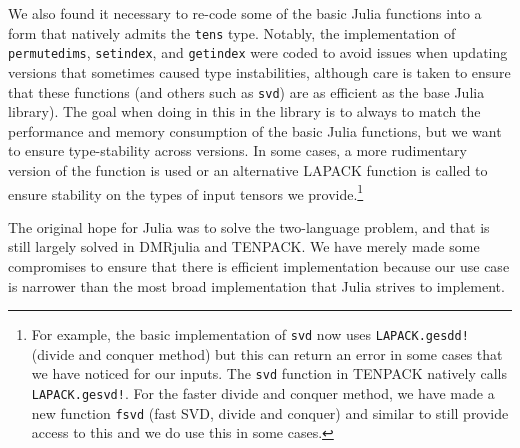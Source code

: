 \documentclass{juliacon}
\begin{document}
We also found it necessary to re-code some of the basic Julia functions into a form that natively admits the {\tt tens} type. Notably, the implementation of {\tt permutedims}, {\tt setindex}, and {\tt getindex} were coded to avoid issues when updating versions that sometimes caused type instabilities, although care is taken to ensure that these functions (and others such as {\tt svd}) are as efficient as the base Julia library). %
The goal when doing in this in the library is to always to match the performance and memory consumption of the basic Julia functions, but we want to ensure type-stability across versions. In some cases, a more rudimentary version of the function is used \cite{press1992numerical} or an alternative LAPACK function is called to ensure stability on the types of input tensors we provide.\footnote{For example, the basic implementation of {\tt svd} now uses {\tt LAPACK.gesdd!} (divide and conquer method) but this can return an error in some cases that we have noticed for our inputs. The {\tt svd} function in TENPACK natively calls {\tt LAPACK.gesvd!}. For the faster divide and conquer method, we have made a new function {\tt fsvd} (fast SVD, divide and conquer) and similar to still provide access to this and we do use this in some cases.}



The original hope for Julia was to solve the two-language problem, and that is still largely solved in DMRjulia and TENPACK. We have merely made some compromises to ensure that there is efficient implementation because our use case is narrower than the most broad implementation that Julia strives to implement.

\end{document}
